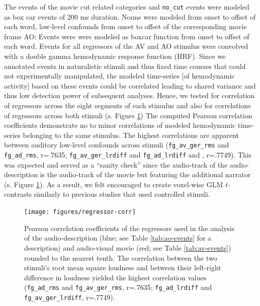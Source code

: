 \documentclass[english]{article}
\begin{document}
The events of the movie cut related categories and \texttt{no\_cut} events were
modeled as box car events of 200 ms duration.
%
Nouns were modeled from onset to offset of each word, low-level confounds from
onset to offset of the corresponding movie frame AO:
Events were were modeled as boxcar function from onset to offset of each word.
Events for all regressors of the AV and AO stimulus were convolved with a double
gamma hemodynamic response function (HRF).
Since we annotated events in naturalistic stimuli and thus fixed time courses
that could not experimentally manipulated, the modeled time-series [of
hemodynamic activity] based on these events could be correlated leading to
shared variance and thus low detection power of subsequent analyses.
Hence, we tested for correlation of regressors across the eight segments of each
stimulus and also for correlations of regressors across both stimuli (s. Figure
\ref{fig:reg-corr})
The computed Pearson correlation coefficients demonstrate no to minor
correlations of modeled hemodynamic time-series belonging to the same stimulus.
The highest correlations are apparent between auditory low-level confounds
across stimuli (\texttt{fg\_av\_ger\_rms} and \texttt{fg\_ad\_rms}, r=.7635;
\texttt{fg\_av\_ger\_lrdiff} and \texttt{fg\_ad\_lrdiff} and , r=.7749).
This was expected and served as a ``sanity check'' since the audio-track of the
audio-description is the audio-track of the movie but featuring the additional
narrator (s. Figure \ref{fig:reg-corr}).
As a result, we felt encouraged to create voxel-wise GLM $t$-contrasts similarly
to previous studies that used controlled stimuli.


\begin{figure}[h!]
\centering
    \texttt{[image: figures/regressor-corr]} \caption{Pearson
        correlation coefficients of the regressors used in the analysis of the
        audio-description (blue; see Table \ref{tab:ao-events} for a
        description) and audio-visual movie (red; see Table \ref{tab:av-events})
        rounded to the nearest tenth.
        The correlation between the two stimuli's
        root mean square loudness and between their left-right difference in
        loudness yielded the highest correlation values
        (\texttt{fg\_ad\_rms} and \texttt{fg\_av\_ger\_rms}, r=.7635;
        \texttt{fg\_ad\_lrdiff} and \texttt{fg\_av\_ger\_lrdiff}, r=.7749).
      }
\label{fig:reg-corr}
\end{figure}
\end{document}
